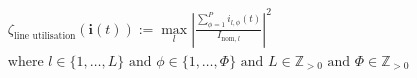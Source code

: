 \begin{equation}
\begin{split}
	&\zeta_\text{line utilisation}(\textbf{i}(t)) :=
	\max_{l}{\left|\frac{\sum_{\phi=1}^{P}{i_{l,\phi}(t)}}{I_{\text{nom},l}}\right|^2} \\
	&\text{where } l \in \{1, \dots, L\} \text{ and } \phi \in \{1, \dots, \Phi\} \text{ and } L \in \mathbb{Z}_{>0} \text{ and } \Phi \in \mathbb{Z}_{>0}
\end{split}
\label{ch1:equ:line-utilisation}
\end{equation}